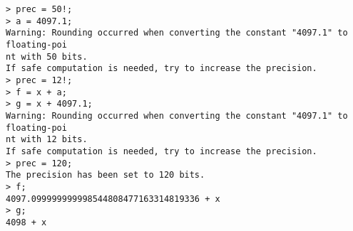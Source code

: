 \begin{center}\begin{minipage}{15cm}\begin{Verbatim}[frame=single]
> prec = 50!;
> a = 4097.1;
Warning: Rounding occurred when converting the constant "4097.1" to floating-poi
nt with 50 bits.
If safe computation is needed, try to increase the precision.
> prec = 12!;
> f = x + a;
> g = x + 4097.1;
Warning: Rounding occurred when converting the constant "4097.1" to floating-poi
nt with 12 bits.
If safe computation is needed, try to increase the precision.
> prec = 120;
The precision has been set to 120 bits.
> f;
4097.099999999998544808477163314819336 + x
> g;
4098 + x
\end{Verbatim}
\end{minipage}\end{center}
